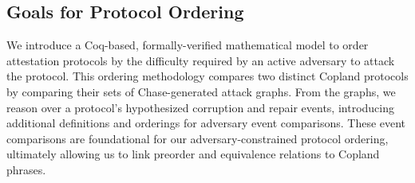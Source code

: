 \documentclass[runningheads]{llncs}
\theoremstyle{definition}
\begin{document}





\subsection*{Goals for Protocol Ordering}

We introduce a Coq-based, formally-verified mathematical model to order attestation protocols by the difficulty required by an active adversary to attack the protocol. This ordering methodology compares two distinct Copland protocols by comparing their sets of Chase-generated attack graphs. From the graphs, we reason over a protocol's hypothesized corruption and repair events, introducing additional definitions and orderings for adversary event comparisons. These event comparisons are foundational for our adversary-constrained protocol ordering, ultimately allowing us to link preorder and equivalence relations to Copland phrases.
\end{document}
